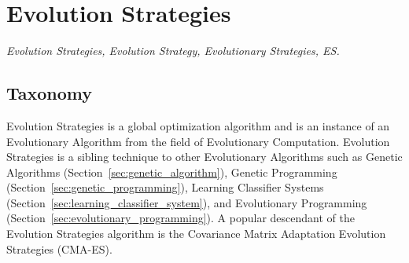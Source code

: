 

\section{Evolution Strategies} 
\label{sec:evolution_strategies}

\emph{Evolution Strategies, Evolution Strategy, Evolutionary Strategies, ES.}

\subsection{Taxonomy}
Evolution Strategies is a global optimization algorithm and is an instance of an Evolutionary Algorithm from the field of Evolutionary Computation.
Evolution Strategies is a sibling technique to other Evolutionary Algorithms such as Genetic Algorithms (Section~\ref{sec:genetic_algorithm}), Genetic Programming (Section~\ref{sec:genetic_programming}), Learning Classifier Systems (Section~\ref{sec:learning_classifier_system}), and Evolutionary Programming (Section~\ref{sec:evolutionary_programming}). A popular descendant of the Evolution Strategies algorithm is the Covariance Matrix Adaptation Evolution Strategies (CMA-ES).

